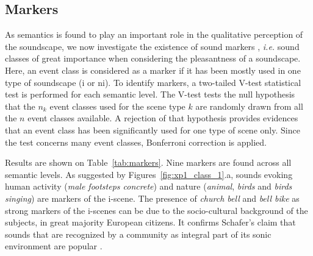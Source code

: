 \documentclass[twoside,twocolumn]{article}
\begin{document}

\subsection{Markers}
\label{sec:markers}

As semantics is found to play an important role in the qualitative perception of the soundscape, we now investigate the existence of sound markers  , \textit{i.e.} sound classes of great importance when considering the pleasantness of a soundscape. Here, an event class is considered as a marker if it has been mostly used in one type of soundscape (i or ni). To identify markers, a two-tailed V-test statistical test is performed for each semantic level. The V-test tests the null hypothesis that the $n_k$ event classes used for the scene type $k$ are randomly drawn from all the $n$ event classes available. A rejection of that hypothesis provides evidences that an event class has been significantly used for one type of scene only. Since the test concerns many event classes, Bonferroni correction is applied.

Results are shown on Table~\ref{tab:markers}. Nine markers are found across all semantic levels. As suggested by Figures~\ref{fig:xp1_class_1}.a, sounds evoking human activity (\textit{male footsteps concrete}) and nature (\textit{animal}, \textit{birds} and \textit{birds singing}) are markers of the i-scene. The presence of \textit{church bell} and \textit{bell bike} as strong markers of the i-scenes can be due to the socio-cultural background of the subjects, in great majority European citizens. It confirms Schafer's claim that sounds that are recognized by a community as integral part of its sonic environment are popular \cite{schafer1977tuning}. 
\end{document}
